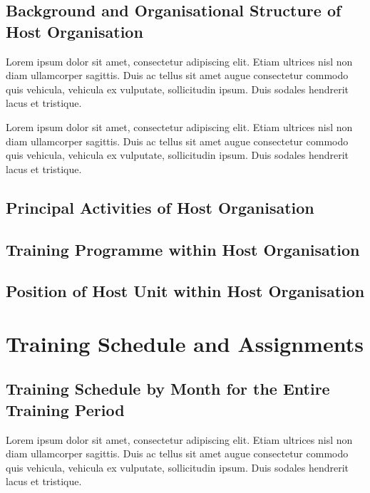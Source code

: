 \documentclass[a4paper, 12pt, fleqn]{report}
\begin{document}
\section{Background and Organisational Structure of Host Organisation}

\onehalfspacing

\noindent Lorem ipsum dolor sit amet, consectetur adipiscing elit. Etiam ultrices nisl
non diam ullamcorper sagittis. Duis ac tellus sit amet augue consectetur commodo quis
vehicula, vehicula ex vulputate, sollicitudin ipsum. Duis sodales hendrerit lacus
et tristique.\newline

\noindent Lorem ipsum dolor sit amet, consectetur adipiscing elit. Etiam ultrices nisl
non diam ullamcorper sagittis. Duis ac tellus sit amet augue consectetur commodo quis
vehicula, vehicula ex vulputate, sollicitudin ipsum. Duis sodales hendrerit lacus
et tristique.\newline


\section{Principal Activities of Host Organisation}

\section{Training Programme within Host Organisation}

\section{Position of Host Unit within Host Organisation}


\chapter{Training Schedule and Assignments}

\section{Training Schedule by Month for the Entire Training Period}

\noindent Lorem ipsum dolor sit amet, consectetur adipiscing elit. Etiam ultrices nisl
non diam ullamcorper sagittis. Duis ac tellus sit amet augue consectetur commodo quis
vehicula, vehicula ex vulputate, sollicitudin ipsum. Duis sodales hendrerit lacus
et tristique.\newline
\end{document}
